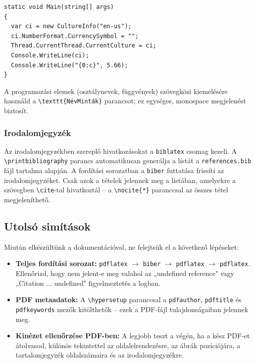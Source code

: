 \documentclass{sapientia-thesis}
\begin{document}
\begin{lstlisting}[language={[Sharp]C}]
static void Main(string[] args)
{
  var ci = new CultureInfo("en-us");
  ci.NumberFormat.CurrencySymbol = "";
  Thread.CurrentThread.CurrentCulture = ci;
  Console.WriteLine(ci);
  Console.WriteLine("{0:c}", 5.66);
}
\end{lstlisting}

A programozási elemek (osztálynevek, függvények) szövegközi kiemelésére használd a \verb|\texttt{NévMinták}| parancsot; ez egységes, monospace megjelenést biztosít.

\subsubsection{Irodalomjegyzék}
Az irodalomjegyzékben szereplő hivatkozásokat a \texttt{biblatex} csomag kezeli. A \verb|\printbibliography| parancs automatikusan generálja a listát a \texttt{references.bib} fájl tartalma alapján. A fordítási sorozatban a \texttt{biber} futtatása frissíti az irodalomjegyzéket. Csak azok a tételek jelennek meg a listában, amelyekre a szövegben \verb|\cite|-tal hivatkoztál -- a \verb|\nocite{*}| paranccsal az összes tétel megjeleníthető.

\subsection{Utolsó simítások}
Miután elkészültünk a dokumentációval, ne felejtsük el a következő lépéseket:
\begin{itemize}
  \item \textbf{Teljes fordítási sorozat:} \texttt{pdflatex} $\to$ \texttt{biber} $\to$ \texttt{pdflatex} $\to$ \texttt{pdflatex}. Ellenőrizd, hogy nem jelent-e meg valahol az „undefined reference" vagy „Citation ... undefined" figyelmeztetés a logban.
  \item \textbf{PDF metaadatok:} A \verb|\hypersetup| paranccsal a \texttt{pdfauthor}, \texttt{pdftitle} és \texttt{pdfkeywords} mezők kitölthetők -- ezek a PDF-fájl tulajdonságaiban jelennek meg.
  \item \textbf{Kinézet ellenőrzése PDF-ben:} A legjobb teszt a végén, ha a kész PDF-et átolvasod, különös tekintettel az oldalelrendezésre, az ábrák pozíciójára, a tartalomjegyzék oldalszámaira és az irodalomjegyzékre.
\end{itemize}
\end{document}
